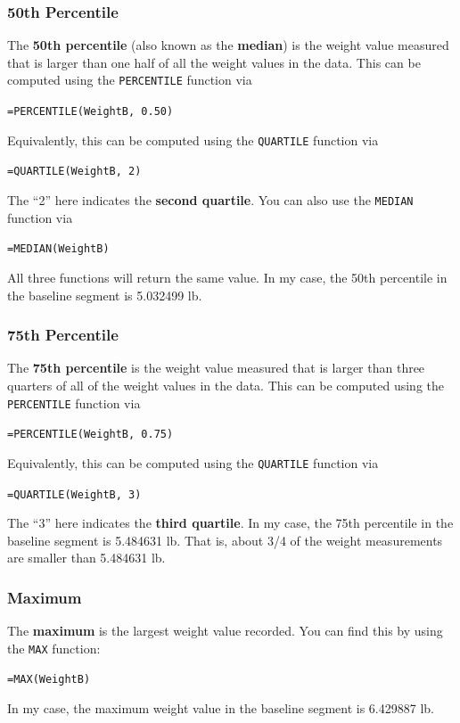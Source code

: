 \subsubsection{50th Percentile}
The \textbf{50th percentile} (also known as the \textbf{median}) is the weight value measured that is larger than one half of all the weight values in the data. This can be computed using the \texttt{PERCENTILE} function via
\begin{center}
    \texttt{=PERCENTILE(WeightB, 0.50)}
\end{center}
Equivalently, this can be computed using the \texttt{QUARTILE} function via
\begin{center}
    \texttt{=QUARTILE(WeightB, 2)}
\end{center}
The ``2'' here indicates the \textbf{second quartile}. You can also use the \texttt{MEDIAN} function via
\begin{center}
    \texttt{=MEDIAN(WeightB)}
\end{center}
All three functions will return the same value. In my case, the 50th percentile in the baseline segment is 5.032499 lb.
\subsubsection{75th Percentile}
The \textbf{75th percentile} is the weight value measured that is larger than three quarters of all of the weight values in the data. This can be computed using the \texttt{PERCENTILE} function via
\begin{center}
    \texttt{=PERCENTILE(WeightB, 0.75)}
\end{center}
Equivalently, this can be computed using the \texttt{QUARTILE} function via
\begin{center}
    \texttt{=QUARTILE(WeightB, 3)}
\end{center}
The ``3'' here indicates the \textbf{third quartile}. In my case, the 75th percentile in the baseline segment is 5.484631 lb. That is, about 3/4 of the weight measurements are smaller than 5.484631 lb.
\subsubsection{Maximum}
The \textbf{maximum} is the largest weight value recorded. You can find this by using the \texttt{MAX} function:
\begin{center}
    \texttt{=MAX(WeightB)}
\end{center}
In my case, the maximum weight value in the baseline segment is 6.429887 lb.
